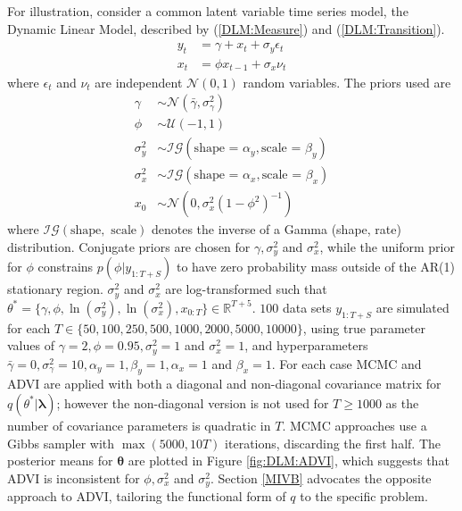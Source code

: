 \documentclass[12pt,a4paper]{article}%
\numberwithin{equation}{section}
\begin{document}
For illustration, consider a common latent variable time series model, the Dynamic Linear Model, described by (\ref{DLM:Measure}) and (\ref{DLM:Transition}).
\begin{align}
y_t &= \gamma + x_t + \sigma_y \epsilon_t \label{DLM:Measure}\\
x_t &= \phi x_{t-1} + \sigma_x \nu_t \label{DLM:Transition}
\end{align}
where $\epsilon_t$ and $\nu_t$ are independent $\mathcal{N}(0, 1)$ random variables. The priors used are
\begin{align}
\gamma &\sim \mathcal{N}(\bar{\gamma}, \sigma^2_{\gamma}) \\
\phi &\sim \mathcal{U}(-1, 1) \\
\sigma^2_y &\sim \mathcal{IG}(\mbox{shape = }\alpha_y, \mbox{scale = }\beta_y) \\
\sigma^2_x &\sim \mathcal{IG}(\mbox{shape = }\alpha_x, \mbox{scale = }\beta_x) \\
x_0 &\sim \mathcal{N}(0, \sigma^2_x(1 - \phi^2)^{-1})
\end{align}
where $\mathcal{IG}(\mbox{shape}, \mbox{ scale})$ denotes the inverse of a Gamma (shape, rate) distribution. Conjugate priors are chosen for $\gamma, \sigma^2_y$ and $\sigma^2_x$, while the uniform prior for $\phi$ constrains $p(\phi | y_{1:T+S})$ to have zero probability mass outside of the AR(1) stationary region. $\sigma^2_y$ and $\sigma^2_x$ are log-transformed such that $\theta^* = \{\gamma, \phi, \ln(\sigma^2_y), \ln(\sigma^2_x), x_{0:T}\} \in \mathbb{R}^{T+5}$. $100$ data sets $y_{1:T+S}$ are simulated for each $T \in \{50, 100, 250, 500, 1000, 2000, 5000, 10000\}$, using true parameter values of $\gamma = 2, \phi = 0.95, \sigma^2_y = 1$ and $\sigma^2_x=1$, and hyperparameters $\bar{\gamma} = 0, \sigma^2_{\gamma} = 10, \alpha_y = 1, \beta_y = 1, \alpha_x = 1$ and $\beta_x = 1$. For each case MCMC and ADVI are applied with both a diagonal and non-diagonal covariance matrix for $q(\theta^* | \boldsymbol{\lambda})$; however the non-diagonal version is not used for $T \geq 1000$ as the number of covariance parameters is quadratic in $T$. MCMC approaches use a Gibbs sampler with $\max(5000, 10T)$ iterations, discarding the first half. The posterior means for $\boldsymbol{\theta}$ are plotted in Figure \ref{fig:DLM:ADVI}, which suggests that ADVI is inconsistent for $\phi, \sigma^2_x$ and $\sigma^2_y$. Section \ref{MIVB} advocates the opposite approach to ADVI, tailoring the functional form of $q$ to the specific problem.

\iffalse
\begin{figure}[h]
\texttt{[image: DLMAdvi]}
\caption{The MCMC and ADVI posterior means for each $\boldsymbol{\theta}$ parameter with $100$ data replications at each $T \in \{50, 100, 250, 500, 1000, 2000\}$. True values for each parameter is denoted by the red line. MCMC consistently estimates of the true value, while both ADVI algorithms are only consistent for the mean parameter $\gamma$.}
\label{fig:DLM:ADVI}
\end{figure}
\fi
\end{document}
